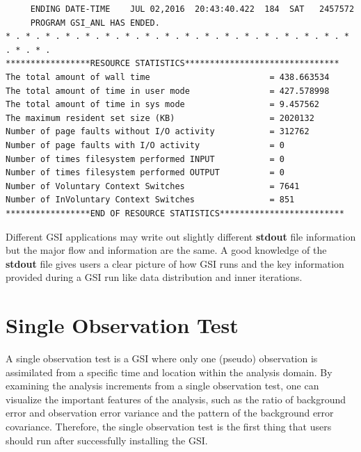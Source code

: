 \begin{scriptsize}
\begin{verbatim}
     ENDING DATE-TIME    JUL 02,2016  20:43:40.422  184  SAT   2457572
     PROGRAM GSI_ANL HAS ENDED.
* . * . * . * . * . * . * . * . * . * . * . * . * . * . * . * . * . * . * . * .
*****************RESOURCE STATISTICS*******************************
The total amount of wall time                        = 438.663534
The total amount of time in user mode                = 427.578998
The total amount of time in sys mode                 = 9.457562
The maximum resident set size (KB)                   = 2020132
Number of page faults without I/O activity           = 312762
Number of page faults with I/O activity              = 0
Number of times filesystem performed INPUT           = 0
Number of times filesystem performed OUTPUT          = 0
Number of Voluntary Context Switches                 = 7641
Number of InVoluntary Context Switches               = 851
*****************END OF RESOURCE STATISTICS*************************
\end{verbatim}
\end{scriptsize}

Different GSI applications may write out slightly different \textbf{stdout} file information but the major flow and information are the same. A good knowledge of the \textbf{stdout} file gives users a clear picture of how GSI runs and the key information provided during a GSI run like data distribution and inner iterations.


\section{Single Observation Test}
\label{sec4.2}

A single observation test is a GSI where only one (pseudo) observation is assimilated from a specific time and location within the analysis domain. By examining the analysis increments from a single observation test, one can visualize the important features of the analysis, such as the ratio of background error and observation error variance and the pattern of the background error covariance. Therefore, the single observation test is the first thing that users should run after successfully installing the GSI.

